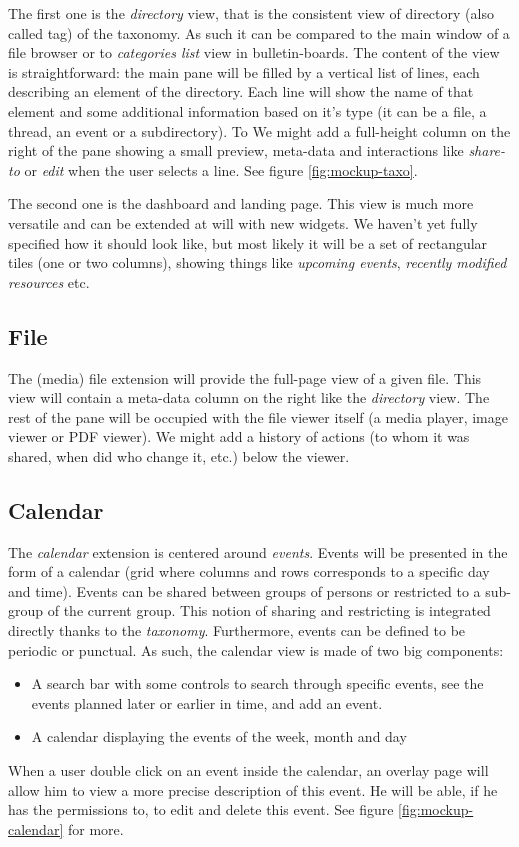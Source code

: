 \documentclass[a4paper, english]{report}
\begin{document}
The first one is the \emph{directory} view, that is the consistent view of directory (also called tag) of the taxonomy. As such it can be compared to the main window of a file browser or to \emph{categories list} view in bulletin-boards. The content of the view is straightforward: the main pane will be filled by a vertical list of lines, each describing an element of the directory. Each line will show the name of that element and some additional information based on it's type (it can be a file, a thread, an event or a subdirectory). To We might add a full-height column on the right of the pane showing a small preview, meta-data and interactions like \emph{share-to} or \emph{edit} when the user selects a line. See figure \ref{fig:mockup-taxo}.

The second one is the dashboard and landing page. This view is much more versatile and can be extended at will with new widgets. We haven't yet fully specified how it should look like, but most likely it will be a set of rectangular tiles (one or two columns), showing things like \emph{upcoming events}, \emph{recently modified resources} etc.

\subsection{File}
The (media) file extension will provide the full-page view of a given file. This view will contain a meta-data column on the right like the \emph{directory} view. The rest of the pane will be occupied with the file viewer itself (a media player, image viewer or PDF viewer). We might add a history of actions (to whom it was shared, when did who change it, etc.) below the viewer.

\subsection{Calendar}
The \emph{calendar} extension is centered around \emph{events}. Events will be presented in the form of a calendar (grid where columns and rows corresponds to a specific day and time). Events can be shared between groups of persons or restricted to a sub-group of the current group. This notion of sharing and restricting is integrated directly thanks to the \textit{taxonomy}. Furthermore, events can be defined to be periodic or punctual. As such, the calendar view is made of two big components:
\begin{itemize}
\item A search bar with some controls to search through specific events, see the events planned later or earlier in time, and add an event.
\item A calendar displaying the events of the week, month and day
\end{itemize}
When a user double click on an event inside the calendar, an overlay page will allow him to view a more precise description of this event. He will be able, if he has the permissions to, to edit and delete this event. 
See figure \ref{fig:mockup-calendar} for more.
\end{document}
